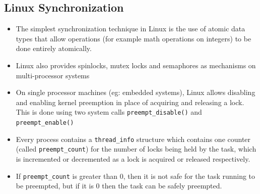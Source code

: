 \documentclass{article}
\theoremstyle{plain}
\theoremstyle{definition}
\begin{document}
\subsection{Linux Synchronization}
\begin{itemize}
    \item The simplest synchronization technique in Linux is the use of atomic data types that allow operations (for example math operations on integers) to be done entirely atomically. 
    
    \item Linux also provides spinlocks, mutex locks and semaphores as mechanisms on multi-processor systems
    
    \item On single processor machines (eg: embedded systems), Linux allows disabling and enabling kernel preemption in place of acquiring and releasing a lock. This is done using two system calls \texttt{preempt\_disable()} and \texttt{preempt\_enable()}
    
    \item Every process contains a \texttt{thread\_info} structure which contains one counter (called \texttt{preempt\_count}) for the number of locks being held by the task, which is incremented or decremented as a lock is acquired or released respectively. 
    
    \item If \texttt{preempt\_count} is greater than 0, then it is not safe for the task running to be preempted, but if it is 0 then the task can be safely preempted. 
\end{itemize}
\end{document}
